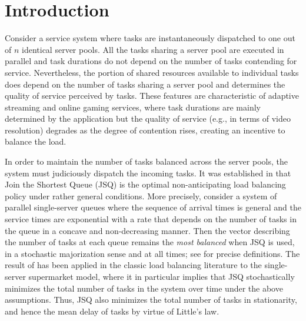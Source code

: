 \documentclass[a4paper, 12pt]{article}
\theoremstyle{definition}
\begin{document}
\section{Introduction}
\label{sec: introduction}

Consider a service system where tasks are instantaneously dispatched to one out of $n$ identical server pools. All the tasks sharing a server pool are executed in parallel and task durations do not depend on the number of tasks contending for service. Nevertheless, the portion of shared resources available to individual tasks does depend on the number of tasks sharing a server pool and determines the quality of service perceived by tasks. These features are characteristic of adaptive streaming and online gaming services, where task durations are mainly determined by the application but the quality of service (e.g., in terms of video resolution) degrades as the degree of contention rises, creating an incentive to balance the load.

In order to maintain the number of tasks balanced across the server pools, the system must judiciously dispatch the incoming tasks. It was established in \cite{menich1991optimality,sparaggis1993extremal} that Join the Shortest Queue (JSQ) is the optimal non-anticipating load balancing policy under rather general conditions. More precisely, consider a system of parallel single-server queues where the sequence of arrival times is general and the service times are exponential with a rate that depends on the number of tasks in the queue in a concave and non-decreasing manner. Then the vector describing the number of tasks at each queue remains the \emph{most balanced} when JSQ is used, in a stochastic majorization sense and at all times; see \cite{marshall1979inequalities} for precise definitions. The result of \cite{menich1991optimality,sparaggis1993extremal} has been applied in the classic load balancing literature to the single-server supermarket model, where it in particular implies that JSQ stochastically minimizes the total number of tasks in the system over time under the above assumptions. Thus, JSQ also minimizes the total number of tasks in stationarity, and hence the mean delay of tasks by virtue of Little's law.
\end{document}
